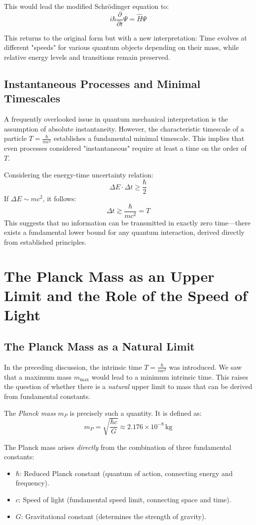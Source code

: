 \documentclass{article}
\begin{document}
This would lead the modified Schrödinger equation to:
\[
i\hbar \frac{\partial}{\partial t}\Psi = \hat{H}\Psi
\]

This returns to the original form but with a new interpretation: Time evolves at different "speeds" for various quantum objects depending on their mass, while relative energy levels and transitions remain preserved.

\subsection{Instantaneous Processes and Minimal Timescales}

A frequently overlooked issue in quantum mechanical interpretation is the assumption of absolute instantaneity. However, the characteristic timescale of a particle \(T = \frac{\hbar}{mc^2}\) establishes a fundamental minimal timescale. This implies that even processes considered "instantaneous" require at least a time on the order of \(T\).

Considering the energy-time uncertainty relation:
\[
\Delta E \cdot \Delta t \geq \frac{\hbar}{2}
\]
If \(\Delta E \sim mc^2\), it follows:
\[
\Delta t \gtrsim \frac{\hbar}{mc^2} = T
\]
This suggests that no information can be transmitted in exactly zero time—there exists a fundamental lower bound for any quantum interaction, derived directly from established principles.

\section{The Planck Mass as an Upper Limit and the Role of the Speed of Light}

\subsection{The Planck Mass as a Natural Limit}

In the preceding discussion, the intrinsic time \(T = \frac{\hbar}{mc^2}\) was introduced. We saw that a maximum mass \(m_{\text{max}}\) would lead to a minimum intrinsic time. This raises the question of whether there is a \textit{natural} upper limit to mass that can be derived from fundamental constants.

The \textit{Planck mass} \(m_P\) is precisely such a quantity. It is defined as:
\[
m_P = \sqrt{\frac{\hbar c}{G}} \approx 2.176 \times 10^{-8} \, \text{kg}
\]

The Planck mass arises \textit{directly} from the combination of three fundamental constants:
\begin{itemize}
	\item \(\hbar\): Reduced Planck constant (quantum of action, connecting energy and frequency).
	\item \(c\): Speed of light (fundamental speed limit, connecting space and time).
	\item \(G\): Gravitational constant (determines the strength of gravity).
\end{itemize}
\end{document}
